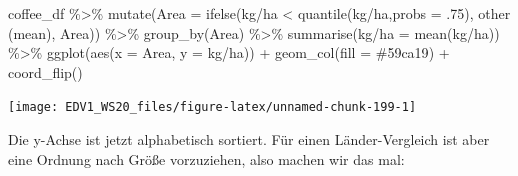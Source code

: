 \documentclass[
]{book}
\newenvironment{Shaded}{\begin{snugshade}}{\end{snugshade}}
\newcommand{\AttributeTok}[1]{\textcolor[rgb]{0.77,0.63,0.00}{#1}}
\newcommand{\DecValTok}[1]{\textcolor[rgb]{0.00,0.00,0.81}{#1}}
\newcommand{\FunctionTok}[1]{\textcolor[rgb]{0.00,0.00,0.00}{#1}}
\newcommand{\NormalTok}[1]{#1}
\newcommand{\OtherTok}[1]{\textcolor[rgb]{0.56,0.35,0.01}{#1}}
\newcommand{\SpecialCharTok}[1]{\textcolor[rgb]{0.00,0.00,0.00}{#1}}
\newcommand{\StringTok}[1]{\textcolor[rgb]{0.31,0.60,0.02}{#1}}
\begin{document}
\begin{Shaded}
\begin{Highlighting}[]
\NormalTok{coffee\_df }\SpecialCharTok{\%\textgreater{}\%} 
  \FunctionTok{mutate}\NormalTok{(}\AttributeTok{Area =} \FunctionTok{ifelse}\NormalTok{(}\StringTok{\textasciigrave{}}\AttributeTok{kg/ha}\StringTok{\textasciigrave{}} \SpecialCharTok{\textless{}} \FunctionTok{quantile}\NormalTok{(}\StringTok{\textasciigrave{}}\AttributeTok{kg/ha}\StringTok{\textasciigrave{}}\NormalTok{,}\AttributeTok{probs =}\NormalTok{ .}\DecValTok{75}\NormalTok{),}
                       \StringTok{\textquotesingle{}other (mean)\textquotesingle{}}\NormalTok{,}
\NormalTok{                       Area)) }\SpecialCharTok{\%\textgreater{}\%} 
  \FunctionTok{group\_by}\NormalTok{(Area) }\SpecialCharTok{\%\textgreater{}\%} 
  \FunctionTok{summarise}\NormalTok{(}\StringTok{\textasciigrave{}}\AttributeTok{kg/ha}\StringTok{\textasciigrave{}} \OtherTok{=} \FunctionTok{mean}\NormalTok{(}\StringTok{\textasciigrave{}}\AttributeTok{kg/ha}\StringTok{\textasciigrave{}}\NormalTok{)) }\SpecialCharTok{\%\textgreater{}\%} 
  \FunctionTok{ggplot}\NormalTok{(}\FunctionTok{aes}\NormalTok{(}\AttributeTok{x =}\NormalTok{ Area,}
             \AttributeTok{y =} \StringTok{\textasciigrave{}}\AttributeTok{kg/ha}\StringTok{\textasciigrave{}}\NormalTok{)) }\SpecialCharTok{+}
  \FunctionTok{geom\_col}\NormalTok{(}\AttributeTok{fill =} \StringTok{\textquotesingle{}\#59ca19\textquotesingle{}}\NormalTok{) }\SpecialCharTok{+}
  \FunctionTok{coord\_flip}\NormalTok{()}
\end{Highlighting}
\end{Shaded}

\begin{center}\texttt{[image: EDV1\_WS20\_files/figure-latex/unnamed-chunk-199-1]} \end{center}

Die y-Achse ist jetzt alphabetisch sortiert. Für einen Länder-Vergleich ist aber eine Ordnung nach Größe vorzuziehen, also machen wir das mal:
\end{document}
